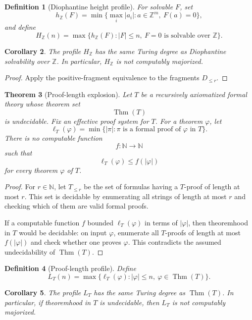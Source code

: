 \documentclass[11pt]{article}
\newtheorem{theorem}{Theorem}[section]
\newtheorem{corollary}[theorem]{Corollary}
\newtheorem{definition}[theorem]{Definition}
\begin{document}
\begin{definition}[Diophantine height profile]
For solvable \(F\), set
\[
h_{\mathbb Z}(F)=
\min\{\max_i|a_i|:a\in\mathbb Z^m,\ F(a)=0\},
\]
and define
\[
H_{\mathbb Z}(n)=
\max\{h_{\mathbb Z}(F):|F|\leq n,\ F=0\text{ is solvable over }\mathbb Z\}.
\]
\end{definition}

\begin{corollary}
The profile \(H_{\mathbb Z}\) has the same Turing degree as Diophantine solvability over \(\mathbb Z\). In particular, \(H_{\mathbb Z}\) is not computably majorized.
\end{corollary}

\begin{proof}
Apply the positive-fragment equivalence to the fragments \(D_{\leq r}\).
\end{proof}

\begin{theorem}[Proof-length explosion]
Let \(T\) be a recursively axiomatized formal theory whose theorem set
\[
\operatorname{Thm}(T)
\]
is undecidable. Fix an effective proof system for \(T\). For a theorem \(\varphi\), let
\[
\ell_T(\varphi)=
\min\{|\pi|:\pi\text{ is a formal proof of }\varphi\text{ in }T\}.
\]
There is no computable function
\[
f:\mathbb N\to\mathbb N
\]
such that
\[
\ell_T(\varphi)\leq f(|\varphi|)
\]
for every theorem \(\varphi\) of \(T\).
\end{theorem}

\begin{proof}
For \(r\in\mathbb N\), let \(T_{\leq r}\) be the set of formulas having a \(T\)-proof of length at most \(r\). This set is decidable by enumerating all strings of length at most \(r\) and checking which of them are valid formal proofs.

If a computable function \(f\) bounded \(\ell_T(\varphi)\) in terms of \(|\varphi|\), then theoremhood in \(T\) would be decidable: on input \(\varphi\), enumerate all \(T\)-proofs of length at most \(f(|\varphi|)\) and check whether one proves \(\varphi\). This contradicts the assumed undecidability of \(\operatorname{Thm}(T)\).
\end{proof}

\begin{definition}[Proof-length profile]
Define
\[
L_T(n)=
\max\{\ell_T(\varphi):|\varphi|\leq n,\ \varphi\in\operatorname{Thm}(T)\}.
\]
\end{definition}

\begin{corollary}
The profile \(L_T\) has the same Turing degree as \(\operatorname{Thm}(T)\). In particular, if theoremhood in \(T\) is undecidable, then \(L_T\) is not computably majorized.
\end{corollary}
\end{document}
